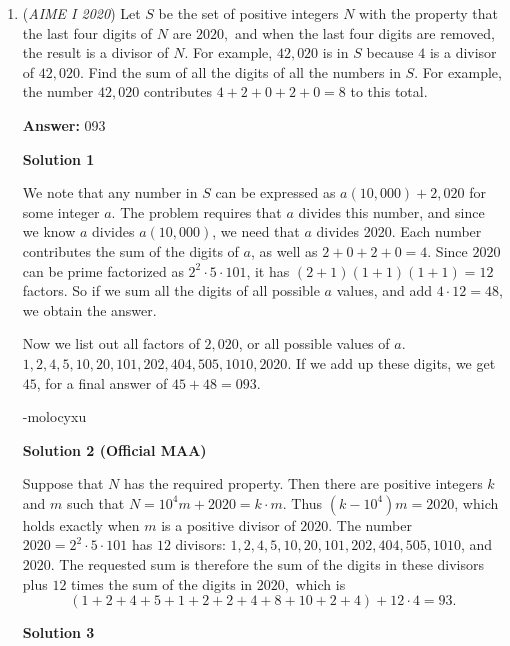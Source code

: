 \begin{enumerate}
 Minor edits by TryhardMathlete

 


	\item (\textit{AIME I 2020}) Let $S$ be the set of positive integers $N$ with the property that the last four digits of $N$ are $2020,$ and when the last four digits are removed, the result is a divisor of $N.$ For example, $42{,}020$ is in $S$ because $4$ is a divisor of $42{,}020.$ Find the sum of all the digits of all the numbers in $S.$ For example, the number $42{,}020$ contributes $4+2+0+2+0=8$ to this total.


 
 \textbf{Answer: }093



\textbf{Solution 1}

We note that any number in $S$ can be expressed as $a(10,000) + 2,020$ for some integer $a$. The problem requires that $a$ divides this number, and since we know $a$ divides $a(10,000)$, we need that $a$ divides 2020. Each number contributes the sum of the digits of $a$, as well as $2 + 0 + 2 +0 = 4$. Since $2020$ can be prime factorized as $2^2 \cdot 5 \cdot 101$, it has $(2+1)(1+1)(1+1) = 12$ factors. So if we sum all the digits of all possible $a$ values, and add $4 \cdot 12 = 48$, we obtain the answer.

 Now we list out all factors of $2,020$, or all possible values of $a$. $1,2,4,5,10,20,101,202,404,505,1010,2020$. If we add up these digits, we get $45$, for a final answer of $45+48=\boxed{093}$.

 -molocyxu

 



\textbf{Solution 2 (Official MAA)}

Suppose that $N$ has the required property. Then there are positive integers $k$ and $m$ such that $N = 10^4m + 2020 = k\cdot m$. Thus $(k - 10^4)m = 2020$, which holds exactly when $m$ is a positive divisor of $2020.$ The number $2020 = 2^2\cdot 5\cdot 101$ has $12$ divisors: $1, 2, 4, 5, 10, 20, 101, 202, 404, 505, 1010$, and $2020.$ The requested sum is therefore the sum of the digits in these divisors plus $12$ times the sum of the digits in $2020,$ which is
 \[(1+2+4+5+1+2+2+4+8+10+2+4)+12\cdot4 = 93.\]




\textbf{Solution 3}


\end{enumerate}
